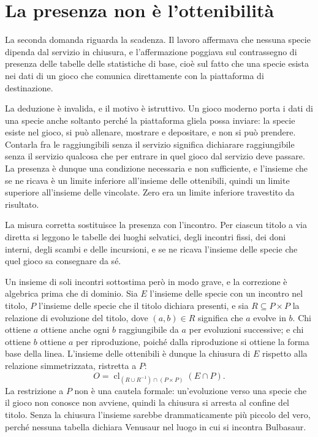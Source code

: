 \section{La presenza non è l'ottenibilità}

La seconda domanda riguarda la scadenza. Il lavoro affermava che nessuna specie dipenda dal servizio in chiusura, e l'affermazione poggiava sul contrassegno di presenza delle tabelle delle statistiche di base, cioè sul fatto che una specie esista nei dati di un gioco che comunica direttamente con la piattaforma di destinazione.

La deduzione è invalida, e il motivo è istruttivo. Un gioco moderno porta i dati di una specie anche soltanto perché la piattaforma gliela possa inviare: la specie esiste nel gioco, si può allenare, mostrare e depositare, e non si può prendere. Contarla fra le raggiungibili senza il servizio significa dichiarare raggiungibile senza il servizio qualcosa che per entrare in quel gioco dal servizio deve passare. La presenza è dunque una condizione necessaria e non sufficiente, e l'insieme che se ne ricava è un limite inferiore all'insieme delle ottenibili, quindi un limite superiore all'insieme delle vincolate. Zero era un limite inferiore travestito da risultato.

La misura corretta sostituisce la presenza con l'incontro. Per ciascun titolo a via diretta si leggono le tabelle dei luoghi selvatici, degli incontri fissi, dei doni interni, degli scambi e delle incursioni, e se ne ricava l'insieme delle specie che quel gioco sa consegnare da sé.

Un insieme di soli incontri sottostima però in modo grave, e la correzione è algebrica prima che di dominio. Sia $E$ l'insieme delle specie con un incontro nel titolo, $P$ l'insieme delle specie che il titolo dichiara presenti, e sia $R \subseteq P \times P$ la relazione di evoluzione del titolo, dove $(a,b) \in R$ significa che $a$ evolve in $b$. Chi ottiene $a$ ottiene anche ogni $b$ raggiungibile da $a$ per evoluzioni successive; e chi ottiene $b$ ottiene $a$ per riproduzione, poiché dalla riproduzione si ottiene la forma base della linea. L'insieme delle ottenibili è dunque la chiusura di $E$ rispetto alla relazione simmetrizzata, ristretta a $P$:
\[
O = \operatorname{cl}_{(R \cup R^{-1}) \cap (P \times P)}(E \cap P).
\]
La restrizione a $P$ non è una cautela formale: un'evoluzione verso una specie che il gioco non conosce non avviene, quindi la chiusura si arresta al confine del titolo. Senza la chiusura l'insieme sarebbe drammaticamente più piccolo del vero, perché nessuna tabella dichiara Venusaur nel luogo in cui si incontra Bulbasaur.

